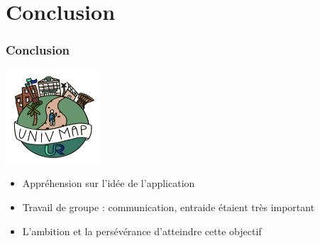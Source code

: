 \documentclass{beamer}
\begin{document}
\section{Conclusion}
%
%
\begin{frame}
  \frametitle{Conclusion}

  \begin{center}
    \includegraphics[width=35mm, scale=0.5]{UnivMap-logo500x500.png}
  \end{center}

  \begin{itemize}
    \item Appréhension sur l'idée de l'application
    \item Travail de groupe : communication, entraide étaient très important
    \item L'ambition et la persévérance d'atteindre cette objectif
  \end{itemize}
\end{frame}
%
%
\end{document}
